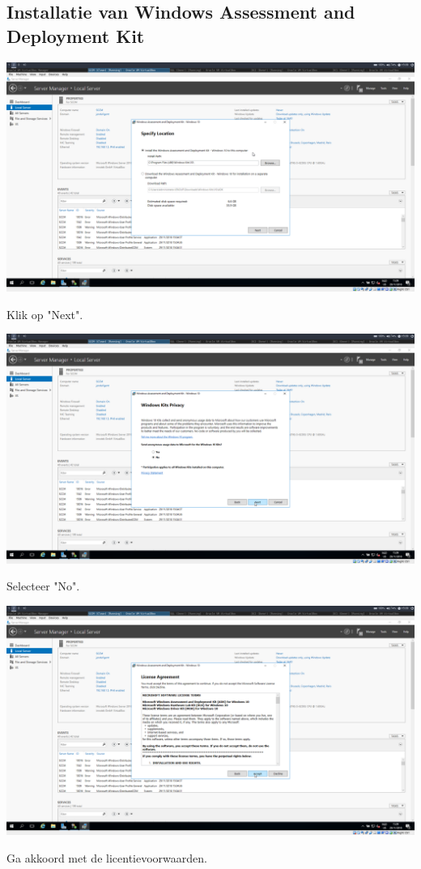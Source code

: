 \documentclass[a4paper]{article}
\begin{document}
\subsection{Installatie van Windows Assessment and Deployment Kit}
\begin{center}
	\includegraphics[width=15cm]{Pictures/SCCM/4/1543500545.png}
	
	Klik op "Next".
\end{center}
\begin{center}
	\includegraphics[width=15cm]{Pictures/SCCM/4/1543500555.png}
	
	Selecteer "No".
\end{center}
\begin{center}
	\includegraphics[width=15cm]{Pictures/SCCM/4/1543500557.png}
	
	Ga akkoord met de licentievoorwaarden.
\end{center}
\end{document}
